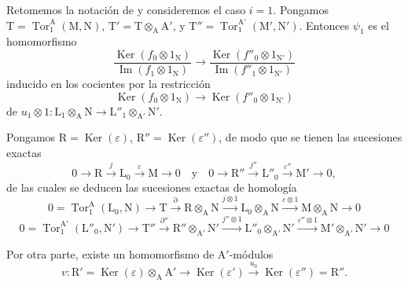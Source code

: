 \begin{env}[11.2.3]
\label{IV.11.2.3}
Retomemos la notación de  y consideremos el caso $i=1$.
Pongamos
$\mathrm{T}=\operatorname{Tor}_1^\mathrm{A}(\mathrm{M},\mathrm{N})$,
$\mathrm{T}'=\mathrm{T}\otimes_\mathrm{A}\mathrm{A}'$, y
$\mathrm{T}''=\operatorname{Tor}_1^{\mathrm{A}'}
(\mathrm{M}',\mathrm{N}')$. Entonces $\psi_1$ es el homomorfismo
\[
  \frac{\operatorname{Ker}(f_0\otimes1_\mathrm{N})}
       {\operatorname{Im}(f_1\otimes1_\mathrm{N})}
  \longrightarrow
  \frac{\operatorname{Ker}(f''_0\otimes1_{\mathrm{N}'})}
       {\operatorname{Im}(f''_1\otimes1_{\mathrm{N}'})}
\]
inducido en los cocientes por la restricción
\[
  \operatorname{Ker}(f_0\otimes1_\mathrm{N})
  \longrightarrow
  \operatorname{Ker}(f''_0\otimes1_{\mathrm{N}'})
\]
de
$u_1\otimes1:\mathrm{L}_1\otimes_\mathrm{A}\mathrm{N}\to
\mathrm{L}''_1\otimes_{\mathrm{A}'}\mathrm{N}'$.

Pongamos $\mathrm{R}=\operatorname{Ker}(\varepsilon)$, $\mathrm{R}''=\operatorname{Ker}(\varepsilon'')$, de modo que se tienen las sucesiones exactas
\begin{equation}
  0\longrightarrow\mathrm{R}\xrightarrow{j}\mathrm{L}_0\xrightarrow{\varepsilon}\mathrm{M}\longrightarrow 0
  \quad\text{y}\quad
  0\longrightarrow\mathrm{R}''\xrightarrow{j''}\mathrm{L}''_0\xrightarrow{\varepsilon''}\mathrm{M}'\longrightarrow 0,
\end{equation}
de las cuales se deducen las sucesiones exactas de homología
\begin{equation}
  0=\operatorname{Tor}_1^\mathrm{A}(\mathrm{L}_0,\mathrm{N})\to\mathrm{T}\xrightarrow{\partial}\mathrm{R}\otimes_\mathrm{A}\mathrm{N}\xrightarrow{j\otimes 1}\mathrm{L}_0\otimes_\mathrm{A}\mathrm{N}\xrightarrow{\varepsilon\otimes 1}\mathrm{M}\otimes_\mathrm{A}\mathrm{N}\to 0
  \label{IV.11.2.3.1}
\tag{11.2.3.1}
\end{equation}
\begin{equation}
  0=\operatorname{Tor}_1^{\mathrm{A}'}(\mathrm{L}''_0,\mathrm{N}')\to\mathrm{T}''\xrightarrow{\partial''}\mathrm{R}''\otimes_{\mathrm{A}'}\mathrm{N}'\xrightarrow{j''\otimes 1}\mathrm{L}''_0\otimes_{\mathrm{A}'}\mathrm{N}'\xrightarrow{\varepsilon''\otimes 1}\mathrm{M}'\otimes_{\mathrm{A}'}\mathrm{N}'\to 0
  \label{IV.11.2.3.2}
\tag{11.2.3.2}
\end{equation}

Por otra parte, existe un homomorfismo de $\mathrm{A}'$-módulos
\[
  v:\mathrm{R}'=\operatorname{Ker}(\varepsilon)\otimes_\mathrm{A}\mathrm{A}'\longrightarrow\operatorname{Ker}(\varepsilon')\xrightarrow{u_0}\operatorname{Ker}(\varepsilon'')=\mathrm{R}''.
\]
\end{env}

